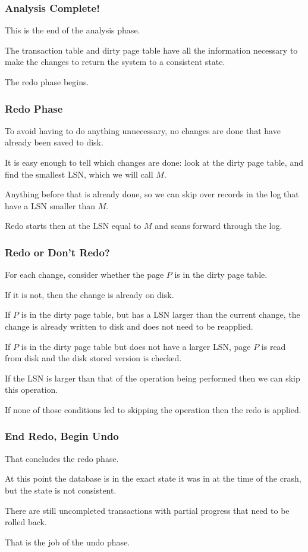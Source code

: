 \begin{frame}
\frametitle{Analysis Complete!}

This is the end of the analysis phase.

The transaction table and dirty page table have all the information necessary to make the changes to return the system to a consistent state.

The redo phase begins.

\end{frame}


\begin{frame}
\frametitle{Redo Phase}

To avoid having to do anything unnecessary, no changes are done that have already been saved to disk. 

It is easy enough to tell which changes are done: look at the dirty page table, and find the smallest LSN, which we will call $M$. 

Anything before that is already done, so we can skip over records in the log that have a LSN smaller than $M$. 

Redo starts then at the LSN equal to $M$ and scans forward through the log.

\end{frame}

\begin{frame}
\frametitle{Redo or Don't Redo?}

For each change, consider whether the page $P$ is in the dirty page table. 

If it is not, then the change is already on disk. 

If $P$ is in the dirty page table, but has a LSN larger than the current change, the change is already written to disk and does not need to be reapplied. 

If $P$ is in the dirty page table but does not have a larger LSN, page $P$ is read from disk and the disk stored version is checked.

If the LSN is larger than that of the operation being performed then we can skip this operation.  

If none of those conditions led to skipping the operation then the redo is applied. 


\end{frame}


\begin{frame}
\frametitle{End Redo, Begin Undo}

That concludes the redo phase. 

At this point the database is in the exact state it was in at the time of the crash, but the state is not consistent. 

There are still uncompleted transactions with partial progress that need to be rolled back. 

That is the job of the undo phase.


\end{frame}


